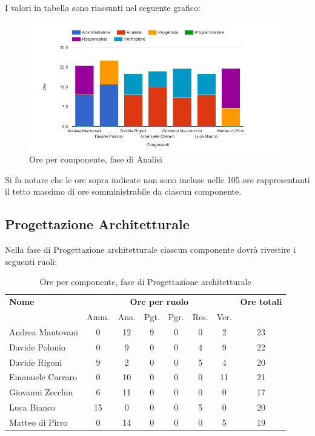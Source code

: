 I valori in tabella sono riassunti nel seguente grafico: \\ 

    \begin{figure}[H]
      \begin{center}
        \includegraphics[width=12cm]{res/img/orePerComponenteAnalisi.png}
      \caption{Ore per componente, fase di Analisi}
      \end{center} 
    \end{figure}    
    
Si fa notare che le ore sopra indicate non sono incluse nelle 105 ore rappresentanti il tetto massimo di ore somministrabile da ciascun componente.


\pagebreak
\subsection{Progettazione Architetturale}
Nella fase di Progettazione architetturale ciascun componente dovrà rivestire i seguenti ruoli:

\begin{table}[H]
\begin{tabular}{lccccccc}
\toprule
    \textbf{Nome}  & \multicolumn{6}{c}{\textbf{Ore per ruolo}} & \textbf{Ore totali} \\
     & Amm. & Ana. & Pgt. & Pgr. & Res. & Ver. & \\
    \midrule
    
	Andrea Mantovani & 0 & 12 & 9 & 0 & 0 & 2 & 23 \\
	Davide Polonio & 0 & 9 & 0 & 0 & 4 & 9 & 22 \\
	Davide Rigoni & 9 & 2 & 0 & 0 & 5 & 4 & 20 \\
	Emanuele Carraro & 0 & 10 & 0 & 0 & 0 & 11 & 21 \\
	Giovanni Zecchin & 6 & 11 & 0 & 0 & 0 & 0 & 17 \\
	Luca Bianco & 15 & 0 & 0 & 0 & 5 & 0 & 20 \\
	Matteo di Pirro & 0 & 14 & 0 & 0 & 0 & 5 & 19 \\
    
    \bottomrule
\end{tabular}
\caption{Ore per componente, fase di Progettazione architetturale}
\end{table}

